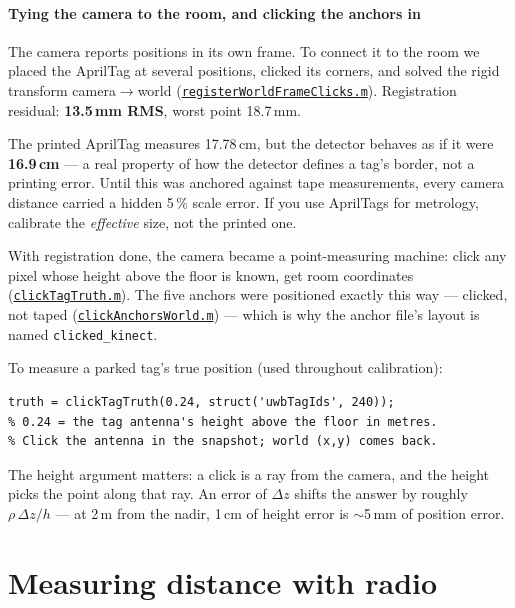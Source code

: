 \documentclass[11pt,a4paper]{article}
\newcommand{\gh}[2]{\href{https://github.com/AdershM-2/UWB_3/blob/main/#1}{\texttt{#2}}}
\newcommand{\code}[1]{\texttt{#1}}
\begin{document}
\subsection{Tying the camera to the room, and clicking the anchors in}
\label{sec:registration}

The camera reports positions in its own frame. To connect it to the room we placed
the AprilTag at several positions, clicked its corners, and solved the rigid
transform camera$\to$world
(\gh{matlab/vision/registerWorldFrameClicks.m}{registerWorldFrameClicks.m}).
Registration residual: \textbf{13.5\,mm RMS}, worst point 18.7\,mm.

\begin{pitfall}
The printed AprilTag measures 17.78\,cm, but the detector behaves as if it were
\textbf{16.9\,cm} --- a real property of how the detector defines a tag's border,
not a printing error. Until this was anchored against tape measurements, every
camera distance carried a hidden 5\,\% scale error. If you use AprilTags for
metrology, calibrate the \emph{effective} size, not the printed one.
\end{pitfall}

With registration done, the camera became a point-measuring machine: click any
pixel whose height above the floor is known, get room coordinates
(\gh{matlab/vision/clickTagTruth.m}{clickTagTruth.m}). The five anchors were
positioned exactly this way --- clicked, not taped
(\gh{matlab/vision/clickAnchorsWorld.m}{clickAnchorsWorld.m}) --- which is why the
anchor file's layout is named \code{clicked\_kinect}.

\begin{tryit}
To measure a parked tag's true position (used throughout calibration):
\begin{lstlisting}
truth = clickTagTruth(0.24, struct('uwbTagIds', 240));
% 0.24 = the tag antenna's height above the floor in metres.
% Click the antenna in the snapshot; world (x,y) comes back.
\end{lstlisting}
The height argument matters: a click is a ray from the camera, and the height picks
the point along that ray. An error of $\Delta z$ shifts the answer by roughly
$\rho\,\Delta z/h$ --- at 2\,m from the nadir, 1\,cm of height error is
$\sim$5\,mm of position error.
\end{tryit}

\part{Measuring distance with radio}
\end{document}

